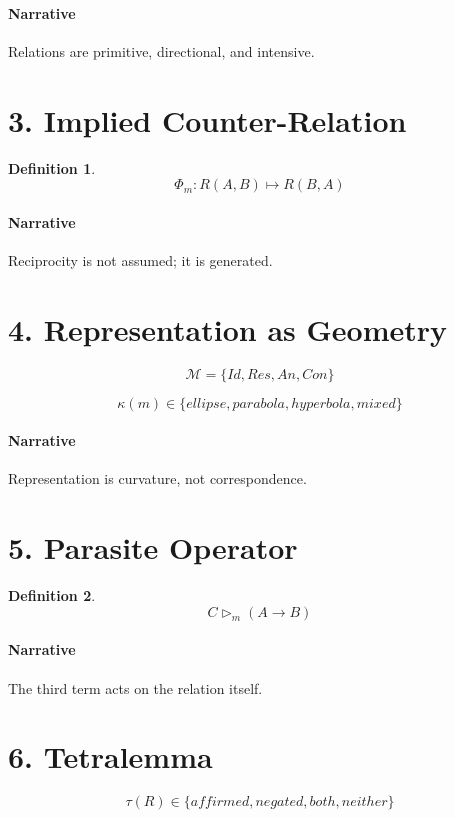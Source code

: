 \documentclass[11pt]{article}
\newtheorem{definition}{Definition}
\begin{document}
\paragraph{Narrative}
Relations are primitive, directional, and intensive.

\section{3. Implied Counter-Relation}

\begin{definition}
\[
\Phi_m : R(A,B) \mapsto R(B,A)
\]
\end{definition}

\paragraph{Narrative}
Reciprocity is not assumed; it is generated.

\section{4. Representation as Geometry}

\[
\mathcal{M} = \{Id, Res, An, Con\}
\]

\[
\kappa(m) \in \{ellipse, parabola, hyperbola, mixed\}
\]

\paragraph{Narrative}
Representation is curvature, not correspondence.

\section{5. Parasite Operator}

\begin{definition}
\[
C \triangleright_m (A \rightarrow B)
\]
\end{definition}

\paragraph{Narrative}
The third term acts on the relation itself.

\section{6. Tetralemma}

\[
\tau(R) \in \{affirmed, negated, both, neither\}
\]
\end{document}
